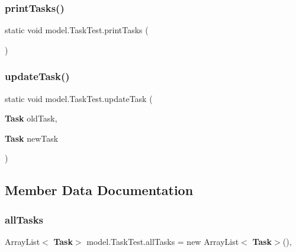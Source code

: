 \mbox{\label{classmodel_1_1_task_test_ab48810faa2a75404b3bf4b2c844fa622}} 
\subsubsection{print\+Tasks()}
{\footnotesize\ttfamily static void model.\+Task\+Test.\+print\+Tasks (\begin{DoxyParamCaption}{ }\end{DoxyParamCaption})\hspace{0.3cm}{\ttfamily [static]}}

\mbox{\label{classmodel_1_1_task_test_ac9223dd86e6636cfa392dd701e5b5737}} 
\subsubsection{update\+Task()}
{\footnotesize\ttfamily static void model.\+Task\+Test.\+update\+Task (\begin{DoxyParamCaption}\item[{\textbf{ Task}}]{old\+Task,  }\item[{\textbf{ Task}}]{new\+Task }\end{DoxyParamCaption})\hspace{0.3cm}{\ttfamily [static]}}



\subsection{Member Data Documentation}
\mbox{\label{classmodel_1_1_task_test_a814a0f1a8098ea82b136aae1cac0ee0e}} 
\subsubsection{all\+Tasks}
{\footnotesize\ttfamily Array\+List$<$\textbf{ Task}$>$ model.\+Task\+Test.\+all\+Tasks = new Array\+List$<$\textbf{ Task}$>$()\hspace{0.3cm}{\ttfamily [static]}, {\ttfamily [private]}}

\mbox{\label{classmodel_1_1_task_test_a1f159fc3786fcf3ec6f649e82eaace58}} 
